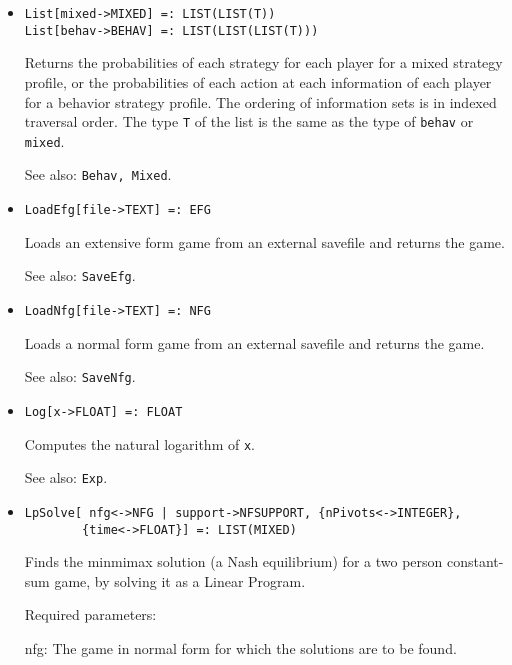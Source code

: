 \begin{itemize}
\item
\protect \large \begin{verbatim}
List[mixed->MIXED] =: LIST(LIST(T))
List[behav->BEHAV] =: LIST(LIST(LIST(T)))
\end{verbatim}\normalsize

\bd 
Returns the probabilities of each strategy for each player for a
mixed strategy profile, or the probabilities of each action at each
information of each player for a behavior strategy profile.  The
ordering of information sets is in indexed traversal order.  The type
\verb+T+ of the list is the same as the type of \verb+behav+ or
\verb+mixed+.
\item
[See also:] {\tt Behav, Mixed}.
\ed

\item
\protect \large \begin{verbatim}
LoadEfg[file->TEXT] =: EFG
\end{verbatim}\normalsize

\bd
Loads an extensive form game from an external savefile
and returns the game.
\item
[See also:] {\tt SaveEfg}.
\ed

\item
\protect \large \begin{verbatim}
LoadNfg[file->TEXT] =: NFG
\end{verbatim}\normalsize

\bd
Loads a normal form game from an external savefile
and returns the game.  
\item
[See also:] {\tt SaveNfg}.
\ed

\item
\protect \large \begin{verbatim}
Log[x->FLOAT] =: FLOAT
\end{verbatim} \normalsize

\bd
Computes the natural logarithm of \verb+x+.
\item
[See also:] {\tt Exp}.
\ed

\item
\protect \large \begin{verbatim}
LpSolve[ nfg<->NFG | support->NFSUPPORT, {nPivots<->INTEGER},
        {time<->FLOAT}] =: LIST(MIXED)
\end{verbatim}\normalsize

\bd
Finds the minmimax solution (a Nash equilibrium) for a
two person constant-sum game, by solving it as a Linear Program.
\item
[Required parameters:]
\bd
\item
[nfg:] The game in normal form for which the solutions are to be found.  
\ed


\end{itemize}
